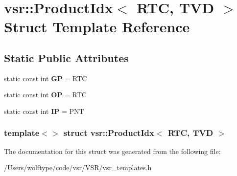 \hypertarget{structvsr_1_1_product_idx_3_01_r_t_c_00_01_t_v_d_01_4}{\section{vsr\-:\-:Product\-Idx$<$ R\-T\-C, T\-V\-D $>$ Struct Template Reference}
\label{structvsr_1_1_product_idx_3_01_r_t_c_00_01_t_v_d_01_4}
}
\subsection*{Static Public Attributes}
\begin{DoxyCompactItemize}
\item 
\hypertarget{structvsr_1_1_product_idx_3_01_r_t_c_00_01_t_v_d_01_4_a7eecae308326224f56028a37b126641f}{static const int {\bfseries G\-P} = R\-T\-C}\label{structvsr_1_1_product_idx_3_01_r_t_c_00_01_t_v_d_01_4_a7eecae308326224f56028a37b126641f}

\item 
\hypertarget{structvsr_1_1_product_idx_3_01_r_t_c_00_01_t_v_d_01_4_ae2ad03d088960135a7b9ddd15ad1da93}{static const int {\bfseries O\-P} = R\-T\-C}\label{structvsr_1_1_product_idx_3_01_r_t_c_00_01_t_v_d_01_4_ae2ad03d088960135a7b9ddd15ad1da93}

\item 
\hypertarget{structvsr_1_1_product_idx_3_01_r_t_c_00_01_t_v_d_01_4_a2988bc22bffb522dd0d96f25ffefc0da}{static const int {\bfseries I\-P} = P\-N\-T}\label{structvsr_1_1_product_idx_3_01_r_t_c_00_01_t_v_d_01_4_a2988bc22bffb522dd0d96f25ffefc0da}

\end{DoxyCompactItemize}
\subsubsection*{template$<$$>$ struct vsr\-::\-Product\-Idx$<$ R\-T\-C, T\-V\-D $>$}



The documentation for this struct was generated from the following file\-:\begin{DoxyCompactItemize}
\item 
/\-Users/wolftype/code/vsr/\-V\-S\-R/vsr\-\_\-templates.\-h\end{DoxyCompactItemize}

